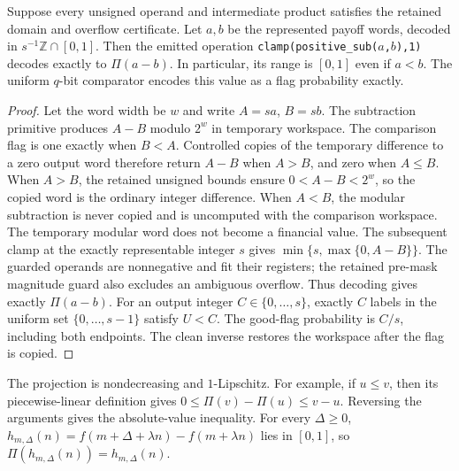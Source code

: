\begin{lemma}
\label{lem:raw-asymmetric-projection}
Suppose every unsigned operand and intermediate product satisfies the
retained domain and overflow certificate. Let $a,b$ be the represented
payoff words, decoded in $s^{-1}\mathbb Z\cap[0,1]$. Then the emitted
operation \texttt{clamp(positive\_sub($a$,$b$),1)} decodes exactly to
$\Pi(a-b)$. In particular, its range is $[0,1]$ even if $a<b$.
The uniform $q$-bit comparator encodes this value as a flag probability
exactly.
\end{lemma}
\begin{proof}
Let the word width be $w$ and write $A=sa$, $B=sb$. The subtraction
primitive produces $A-B$ modulo $2^w$ in temporary workspace. The
comparison flag is one exactly when $B<A$. Controlled copies of the
temporary difference to a zero output word therefore return $A-B$ when
$A>B$, and zero when $A\leq B$. When $A>B$, the retained unsigned
bounds ensure $0<A-B<2^w$, so the copied word is the ordinary integer
difference. When $A<B$, the modular subtraction is never copied and is
uncomputed with the comparison workspace. The temporary modular word
does not become a financial value. The subsequent clamp at the exactly
representable integer $s$ gives $\min\{s,\max\{0,A-B\}\}$.
The guarded operands are nonnegative and fit their registers; the
retained pre-mask magnitude guard also excludes an ambiguous overflow.
Thus decoding gives exactly $\Pi(a-b)$. For an output integer
$C\in\{0,\ldots,s\}$, exactly $C$ labels in the uniform set
$\{0,\ldots,s-1\}$ satisfy $U<C$. The good-flag probability is
$C/s$, including both endpoints. The clean inverse restores the
workspace after the flag is copied.
\end{proof}

The projection is nondecreasing and $1$-Lipschitz. For example, if
$u\leq v$, then its piecewise-linear definition gives
$0\leq\Pi(v)-\Pi(u)\leq v-u$. Reversing the arguments gives the
absolute-value inequality. For every $\Delta\geq0$,
$h_{m,\Delta}(n)=f(m+\Delta+\lambda n)-f(m+\lambda n)$ lies in
$[0,1]$, so $\Pi(h_{m,\Delta}(n))=h_{m,\Delta}(n)$.

